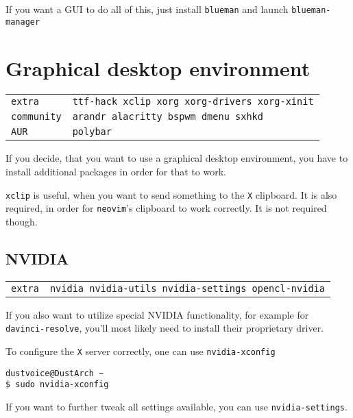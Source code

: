 \documentclass[9pt]{report}
\newenvironment{NOTE}
{\begin{tcolorbox}[colback=admonitionBG,coltitle=draculaFG,colframe=draculaBlue,colbacktitle=draculaBlue,title=NOTE]}
{\end{tcolorbox}}
\newenvironment{packagetable}
{\begin{longtabu}to \textwidth [b]{X[1,r]|X[1,l]}}
{\end{longtabu}}
\begin{document}
If you want a GUI to do all of this, just install \texttt{blueman} and launch \texttt{blueman-manager}



\newpage

\hypertarget{x-graphical-desktop-environment}{\section{Graphical desktop environment}}
\begin{packagetable}
    \texttt{extra} & \texttt{ttf-hack xclip xorg xorg-drivers xorg-xinit} \\ 
    \texttt{community} & \texttt{arandr alacritty bspwm dmenu sxhkd} \\ 
    \texttt{AUR} & \texttt{polybar} \\ 
\end{packagetable}

If you decide, that you want to use a graphical desktop environment, you have to install additional packages in order for that to work.


\begin{NOTE}
    \texttt{xclip} is useful, when you want to send something to the \texttt{X} clipboard.
    It is also required, in order for \texttt{neovim}'s clipboard to work correctly.
    It is not required though.

\end{NOTE}

\newpage

\hypertarget{x-nvidia}{\subsection{NVIDIA}}
\begin{packagetable}
    \texttt{extra} & \texttt{nvidia nvidia-utils nvidia-settings opencl-nvidia} \\ 
\end{packagetable}

If you also want to utilize special NVIDIA functionality, for example for \texttt{davinci-resolve}, you’ll most likely need to install their proprietary driver.


To configure the \texttt{X} server correctly, one can use \texttt{nvidia-xconfig}


\begin{verbatim}
dustvoice@DustArch ~
$ sudo nvidia-xconfig
\end{verbatim}

If you want to further tweak all settings available, you can use \texttt{nvidia-settings}.
\end{document}
